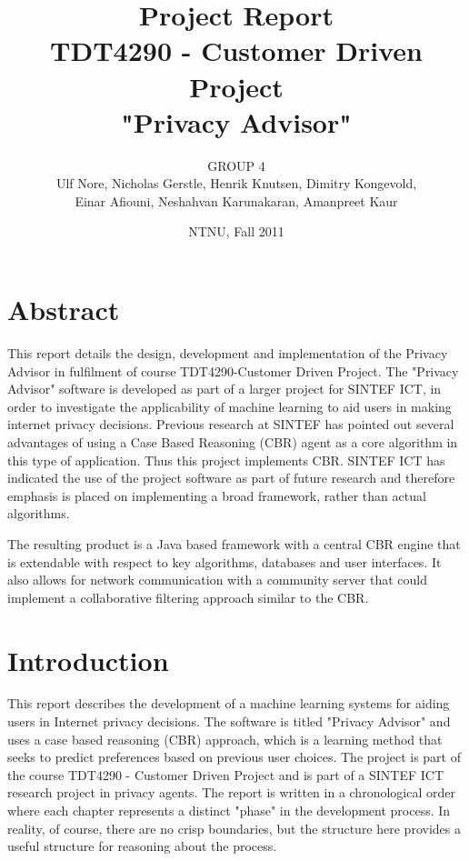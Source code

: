 \documentclass[11pt]{book}
\title{Project Report\\
TDT4290 - Customer Driven Project \\ 
"Privacy Advisor"}
\author{GROUP 4\\
Ulf Nore, Nicholas Gerstle, Henrik Knutsen, Dimitry Kongevold,\\ 
Einar Afiouni, Neshahvan Karunakaran, Amanpreet Kaur}
\date{NTNU, Fall 2011}
\begin{document}
\frontmatter
\maketitle

\chapter*{\centering Abstract}
This report details the design, development and implementation of the Privacy Advisor in fulfilment of course TDT4290-Customer Driven Project. The "Privacy Advisor"
software is developed as part of a larger project for SINTEF ICT, in
order to investigate the applicability of machine learning to aid users in
making internet privacy decisions. Previous research at SINTEF has pointed
out several advantages of using a Case Based Reasoning (CBR) agent as
a core algorithm in this type of application. Thus this project implements CBR. SINTEF ICT
has indicated the use of the project software as part of future
research and therefore emphasis is placed on implementing a broad
framework, rather than actual algorithms.

The resulting product is a Java based framework with a central CBR
engine that is extendable with respect to key algorithms, databases
and user interfaces. It also allows for network communication with a
community server that could implement a collaborative filtering approach 
similar to the CBR.


\dominitoc

\listoftables
\listoffigures
\tableofcontents \label{toc}



\chapter{Introduction}

This report describes the development of a machine learning systems for aiding users in Internet privacy decisions. The software is titled "Privacy Advisor" and uses a case based reasoning (CBR) approach, which is a learning method that seeks to predict preferences based on previous user choices. The project is part of the course TDT4290 - Customer Driven Project and is part of a SINTEF ICT research project in privacy agents. The report is written in a chronological order where each chapter represents a distinct "phase" in the development process. In reality, of course, there are no crisp boundaries, but the structure here provides a useful structure for reasoning about the process. 
\end{document}
